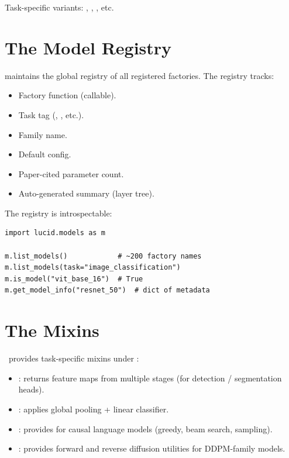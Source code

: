 Task-specific variants: ,
,
, etc.

\section{The Model Registry}
\label{sec:zoo_architecture:registry}

 maintains the global registry of
all registered factories. The registry tracks:

\begin{itemize}
  \item Factory function (callable).
  \item Task tag (,
    , etc.).
  \item Family name.
  \item Default config.
  \item Paper-cited parameter count.
  \item Auto-generated summary (layer tree).
\end{itemize}

The registry is introspectable:

\begin{lstlisting}[style=lucid,language=LucidPython]
import lucid.models as m

m.list_models()            # ~200 factory names
m.list_models(task="image_classification")
m.is_model("vit_base_16")  # True
m.get_model_info("resnet_50")  # dict of metadata
\end{lstlisting}

\section{The Mixins}
\label{sec:zoo_architecture:mixins}

\Lucid\ provides task-specific mixins under
:

\begin{itemize}
  \item {}: returns feature maps from
    multiple stages (for detection / segmentation heads).
  \item {}: applies global pooling +
    linear classifier.
  \item {}: provides  for
    causal language models (greedy, beam search, sampling).
  \item {}: provides forward and reverse
    diffusion utilities for DDPM-family models.
\end{itemize}

